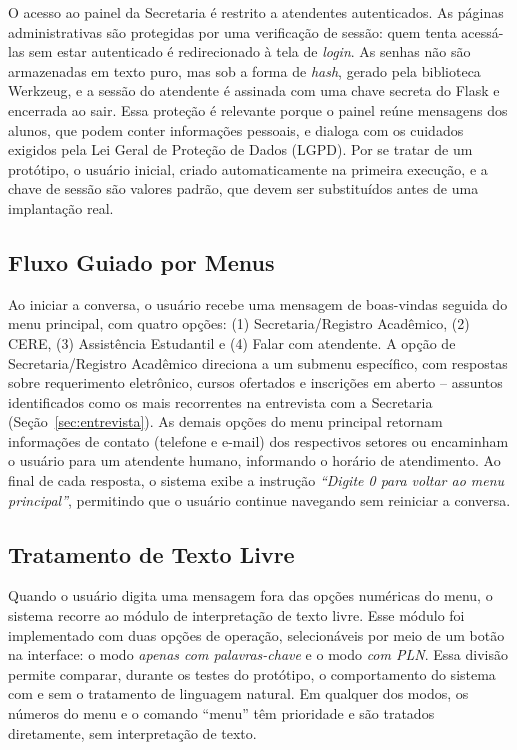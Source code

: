 \documentclass[12pt]{article}
\begin{document}
O acesso ao painel da Secretaria é restrito a atendentes autenticados. As
páginas administrativas são protegidas por uma verificação de sessão: quem
tenta acessá-las sem estar autenticado é redirecionado à tela de \textit{login}.
As senhas não são armazenadas em texto puro, mas sob a forma de \textit{hash},
gerado pela biblioteca Werkzeug, e a sessão do atendente é assinada com uma
chave secreta do Flask e encerrada ao sair. Essa proteção é relevante porque o
painel reúne mensagens dos alunos, que podem conter informações pessoais, e
dialoga com os cuidados exigidos pela Lei Geral de Proteção de Dados (LGPD).
Por se tratar de um protótipo, o usuário inicial, criado automaticamente na
primeira execução, e a chave de sessão são valores padrão, que devem ser
substituídos antes de uma implantação real.

\subsection{Fluxo Guiado por Menus}

Ao iniciar a conversa, o usuário recebe uma mensagem de boas-vindas
seguida do menu principal, com quatro opções: (1) Secretaria/Registro
Acadêmico, (2) CERE, (3) Assistência Estudantil e (4) Falar com
atendente. A opção de Secretaria/Registro Acadêmico direciona a um
submenu específico, com respostas sobre requerimento eletrônico, cursos
ofertados e inscrições em aberto -- assuntos identificados como os mais
recorrentes na entrevista com a Secretaria (Seção~\ref{sec:entrevista}). As demais opções do
menu principal retornam informações de contato (telefone e e-mail) dos
respectivos setores ou encaminham o usuário para um atendente humano,
informando o horário de atendimento. Ao final de cada resposta, o
sistema exibe a instrução \textit{``Digite 0 para voltar ao menu
principal''}, permitindo que o usuário continue navegando sem reiniciar a
conversa.

\subsection{Tratamento de Texto Livre}\label{sec:textolivre}

Quando o usuário digita uma mensagem fora das opções numéricas do menu, o
sistema recorre ao módulo de interpretação de texto livre. Esse módulo foi
implementado com duas opções de operação, selecionáveis por meio de um
botão na interface: o modo \textit{apenas com palavras-chave} e o modo
\textit{com PLN}. Essa divisão permite comparar, durante os testes do
protótipo, o comportamento do sistema com e sem o tratamento de linguagem
natural. Em qualquer dos modos, os números do menu e o comando ``menu'' têm
prioridade e são tratados diretamente, sem interpretação de texto.
\end{document}
